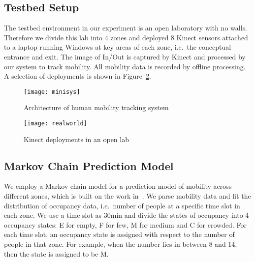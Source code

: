 \documentclass{sig-alternate}
\begin{document}
\subsection{Testbed Setup}
\label{sec:testbed-setup}

 The testbed environment in our experiment is an open laboratory with no walls. Therefore we divide this lab into 4 zones and deployed 8 Kinect sensors attached to a laptop running Windows at key areas of each zone, i.e.\ the conceptual entrance and exit. The image of In/Out is captured by Kinect and processed by our system to track mobility. All mobility data is recorded by offline processing. A selection of deployments is shown in Figure~\ref{fig:kinect-deployment}. 




\begin{figure}[!tb]
  \centering
  \texttt{[image: minisys]}
  \caption{Architecture of human mobility tracking system}
  \label{fig:system-arch}
\end{figure}

\begin{figure}[!tb]
  \centering
  \texttt{[image: realworld]}
  \caption{Kinect deployments in an open lab}
  \label{fig:kinect-deployment}
\end{figure}



\subsection{Markov Chain Prediction Model}
\label{sec:mark-chain-pred}


We employ a Markov chain model for a prediction model of mobility across different zones, which is built on the work in~\cite{ref:Erickson:2009,ref:Erickson:2010}. We parse mobility data and fit the distribution of occupancy data, i.e.\ number of people at a specific time slot in each zone. We use a time slot as 30min and divide the states of occupancy into 4 occupancy states: E for empty, F for few, M for medium and C for crowded. For each time slot, an occupancy state is assigned with respect to the number of people in that zone. For example, when the number lies in between 8 and 14, then the state is assigned to be M. 


\par
\end{document}
